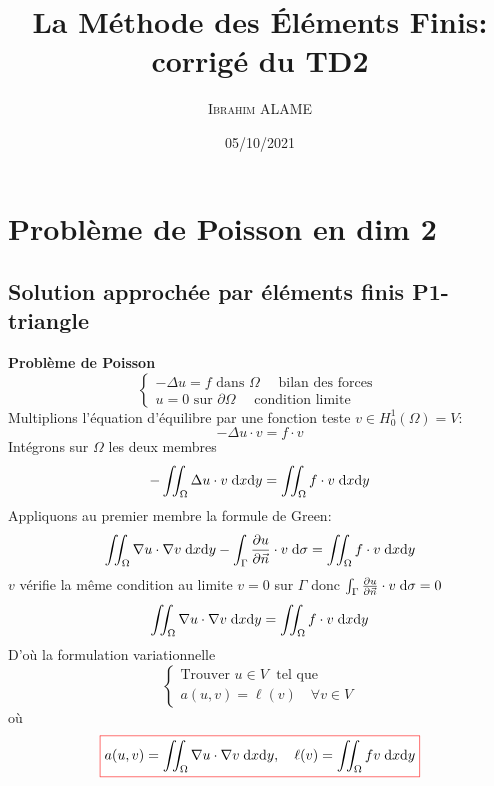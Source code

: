\documentclass{article}
\title{La Méthode des Éléments Finis: corrigé du TD2}
\author{ \textsc{Ibrahim ALAME}}
\date{05/10/2021}
\def \de {{\rm d}}
\newcommand{\myredbox}[1]{\fcolorbox{red}{white}{$\displaystyle#1$}}
\begin{document}
  \lstset{
    frame       = single,
    numbers     = left,
    showspaces  = false,
    showstringspaces    = false,
    captionpos  = t,
    caption     = \lstname
}
\maketitle
\section*{Problème de Poisson en dim 2}

\subsection*{Solution approchée par éléments finis P1-triangle}
{\bf Problème de Poisson}
\begin{equation}
\left\{
\begin{array}{l}
-\Delta u = f \mbox{ dans } \Omega \quad \mbox{ bilan des forces }\\
u=0  \mbox{ sur } \partial \Omega \quad \mbox{ condition limite }
\end{array}
\right.
\end{equation}
Multiplions l'équation d'équilibre par une fonction teste $v\in H_0^1(\Omega)=V$:
 \[ -\Delta u \cdot v= f \cdot v \]
 Intégrons sur $\Omega$ les deux membres
\[\displaystyle -\iint_{\Omega}\Delta u \cdot v \; \de x\de y= \iint_{\Omega}f \cdot v \; \de x\de y\]
Appliquons au premier membre la formule de Green:
\[ \iint_\Omega \nabla u\cdot \nabla v \; \de x\de y-\int_\Gamma  \frac{\partial u}{\partial \vec n} \cdot v \; \de \sigma = \iint_{\Omega}f \cdot v \; \de x\de y\]
$v$ vérifie la même condition au limite $v=0$ sur $\Gamma$ donc $\int_\Gamma  \frac{\partial u}{\partial \vec n} \cdot v \; \de \sigma=0$
\[ \iint_\Omega \nabla u\cdot \nabla v \; \de x\de y = \iint_{\Omega}f \cdot v \; \de x\de y\]
D'où la formulation variationnelle
\begin{equation}
\left\{
\begin{array}{l}
\mbox{Trouver } u \in V\;\mbox{ tel que }\\
a(u,v)= \ell(v) \quad \forall v\in V 
\end{array}
\right.
\end{equation}
où
\[\myredbox{a(u,v)=\iint_\Omega \nabla u\cdot \nabla v \; \de x \de y, \quad \ell(v)=\iint_\Omega f v \; \de x\de y }\]
\end{document}
